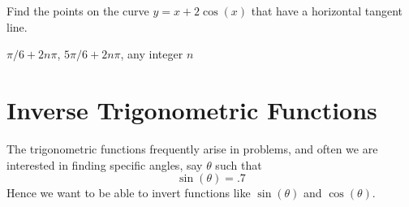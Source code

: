 \begin{exercises}
\begin{exercise} Find the points on the curve $y= x+ 2\cos(x)$ that have a
horizontal tangent line.
\begin{answer} $\pi/6+2n\pi$, $5\pi/6+2n\pi$, any integer $n$
\end{answer}\end{exercise}

\end{exercises}











\section{Inverse Trigonometric Functions}{}{}

The trigonometric functions frequently arise in problems, and often we
are interested in finding specific angles, say $\theta$ such that
\[
\sin(\theta) = .7
\]
Hence we want to be able to invert functions like $\sin(\theta)$ and
$\cos(\theta)$.  

